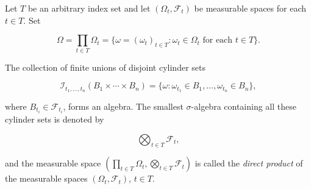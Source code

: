Let $T$ be an arbitrary index set and let $(\Omega_t, \mathcal{F}_t)$ be measurable spaces for each $t \in T$. Set

$$\Omega = \prod_{t \in T} \Omega_t = \{\omega = (\omega_t)_{t \in T} : \omega_t \in \Omega_t \text{ for each } t \in T\}.$$

The collection of finite unions of disjoint cylinder sets

$$\mathcal{I}_{t_1, \ldots, t_n}(B_1 \times \cdots \times B_n) = \{\omega : \omega_{t_1} \in B_1, \ldots, \omega_{t_n} \in B_n\},$$

where $B_{t_i} \in \mathcal{F}_{t_i}$, forms an algebra. The smallest $\sigma$-algebra containing all these cylinder sets is denoted by

$$\bigotimes_{t \in T} \mathcal{F}_t,$$

and the measurable space $(\prod_{t \in T} \Omega_t, \bigotimes_{t \in T} \mathcal{F}_t)$ is called the \textit{direct product} of the measurable spaces $(\Omega_t, \mathcal{F}_t)$, $t \in T$.

